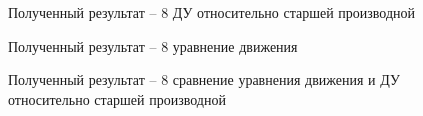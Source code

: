 \documentclass[12pt]{article}
\begin{document}
	\begin{figure}[h]
	\caption{Полученный результат -- 8 ДУ относительно старшей производной}
\end{figure}

\begin{figure}[h]
	\caption{Полученный результат --  8 уравнение движения}
\end{figure}

	\begin{figure}[h]
	\caption{Полученный результат --  8 сравнение уравнения движения и ДУ относительно старшей производной}
\end{figure}
\end{document}
